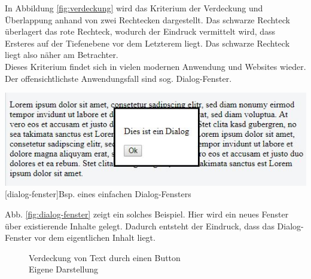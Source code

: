 In Abbildung \ref{fig:verdeckung} wird das Kriterium der Verdeckung und Überlappung anhand von zwei Rechtecken dargestellt. Das schwarze Rechteck überlagert das rote Rechteck, wodurch der Eindruck vermittelt wird, dass Ersteres auf der Tiefenebene vor dem Letzterem liegt. Das schwarze Rechteck liegt also näher am Betrachter.\\

Dieses Kriterium findet sich in vielen modernen Anwendung und Websites wieder. Der offensichtlichste Anwendungsfall sind sog. Dialog-Fenster.

\vspace{1em}
\begin{minipage}{\linewidth}
	\centering
	\includegraphics[width=0.7\linewidth]{images/dialog_fenster.jpg}
	[dialog-fenster]{Bsp. eines einfachen Dialog-Fensters}
	\label{fig:dialog-fenster}
\end{minipage}
\vspace{1em} 

Abb. \ref{fig:dialog-fenster} zeigt ein solches Beispiel. Hier wird ein neues Fenster über existierende Inhalte gelegt. Dadurch entsteht der Eindruck, dass das Dialog-Fenster vor dem eigentlichen Inhalt liegt.

\begin{figure}[!ht]
\centering
{}
\caption[Verdeckung von Text durch einen Button]{Verdeckung von Text durch einen Button\\ Eigene Darstellung}
\label{sample_verdeckung}
\end{figure}

